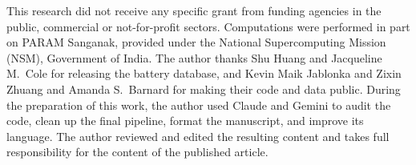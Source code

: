\documentclass[journal=jcisd8,manuscript=article,layout=traditional]{achemso}
\begin{document}
\begin{acknowledgement}
This research did not receive any specific grant from funding agencies in the public, commercial or not-for-profit sectors. Computations were performed in part on PARAM Sanganak, provided under the National Supercomputing Mission (NSM), Government of India. The author thanks Shu Huang and Jacqueline M.\ Cole for releasing the battery database, and Kevin Maik Jablonka and Zixin Zhuang and Amanda S.\ Barnard for making their code and data public. During the preparation of this work, the author used Claude and Gemini to audit the code, clean up the final pipeline, format the manuscript, and improve its language. The author reviewed and edited the resulting content and takes full responsibility for the content of the published article.
\end{acknowledgement}


\end{document}
